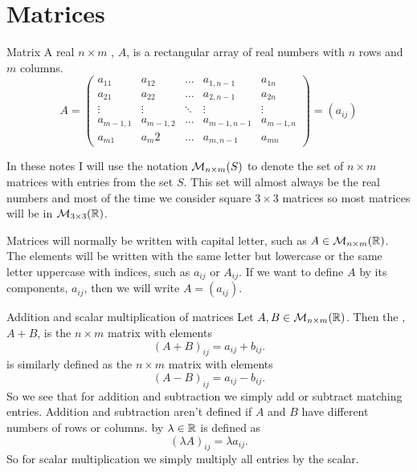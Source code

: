 \section{Matrices}
\begin{definition}{Matrix}{}
    A real \(n\times m\) , \(A\), is a rectangular array of real numbers with \(n\) rows and \(m\) columns.
    \[
    A = 
    \begin{pmatrix}
        a_{11}     & a_{12}     & \dots  & a_{1, n-1}    & a_{1n} \\
        a_{21}     & a_{22}     & \dots  & a_{2, n-1}    & a_{2n} \\
        \vdots     & \vdots     & \ddots & \vdots & \vdots \\
        a_{m-1, 1} & a_{m-1, 2} & \dots  &  a_{m-1, n-1} & a_{m-1, n}\\
        a_{m1}     & a_m{2}     & \dots  &  a_{m, n-1}    & a_{mn}
    \end{pmatrix}
    = (a_{ij})
    \]
\end{definition}
\begin{notation*}{}
    In these notes I will use the notation \(\mathcal{M}_{{n}\times{m}}({S})\) to denote the set of \(n\times m\) matrices with entries from the set \(S\).
    This set will almost always be the real numbers and most of the time we consider square \(3\times 3\) matrices so most matrices will be in \(\mathcal{M}_{{3}\times{3}}({\mathbb{R}})\).
\end{notation*}
\begin{notation*}{}
    Matrices will normally be written with capital letter, such as \(A\in\mathcal{M}_{{n}\times{m}}({\mathbb{R}})\).
    The elements will be written with the same letter but lowercase or the same letter uppercase with indices, such as \(a_{ij}\) or \(A_{ij}\).
    If we want to define \(A\) by its components, \(a_{ij}\), then we will write \(A = (a_{ij})\).
\end{notation*}
\begin{definition}{Addition and scalar multiplication of matrices}{}
    Let \(A, B \in \mathcal{M}_{{n}\times{m}}({\mathbb{R}})\).
    Then the , \(A + B\), is the \(n\times m\) matrix with elements
    \[(A + B)_{ij} = a_{ij} + b_{ij}.\]
     is similarly defined as the \(n\times m\) matrix with elements
    \[(A - B)_{ij} = a_{ij} - b_{ij}.\]
    So we see that for addition and subtraction we simply add or subtract matching entries.
    Addition and subtraction aren't defined if \(A\) and \(B\) have different numbers of rows or columns.
     by \(\lambda\in\mathbb{R}\) is defined as
    \[(\lambda A)_{ij} = \lambda a_{ij}.\]
    So for scalar multiplication we simply multiply all entries by the scalar.
\end{definition}
